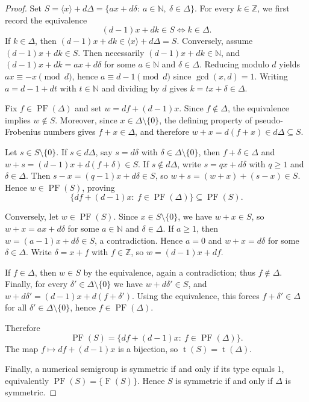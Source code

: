 \documentclass[10pt,a4paper]{amsart}
\begin{document}
\begin{proof}
Set $S=\langle x\rangle+d\Delta=\{ax+d\delta:\ a\in\mathbb{N},\ \delta\in\Delta\}$.
For every \(k\in\mathbb{Z}\), we first record the equivalence
\[
(d-1)x+dk\in S \iff k\in\Delta.
\]
If $k\in\Delta$, then $(d-1)x+dk\in\langle x\rangle+d\Delta=S$. Conversely, assume
\((d-1)x+dk\in S\). Then necessarily \((d-1)x+dk\in\mathbb{N}\), and $(d-1)x+dk=ax+d\delta$ for some $a\in\mathbb{N}$ and
$\delta\in\Delta$. Reducing modulo $d$ yields $ax\equiv -x\pmod d$, hence
$a\equiv d-1\pmod d$ since $\gcd(x,d)=1$. Writing $a=d-1+dt$ with
$t\in\mathbb{N}$ and dividing by $d$ gives $k=tx+\delta\in\Delta$.

Fix $f\in\operatorname{PF}(\Delta)$ and set $w=df+(d-1)x$. Since $f\notin\Delta$,
the equivalence implies $w\notin S$. Moreover, since $x\in\Delta\setminus\{0\}$,
the defining property of pseudo-Frobenius numbers gives $f+x\in\Delta$, and therefore
$w+x=d(f+x)\in d\Delta\subseteq S$.

Let $s\in S\setminus\{0\}$. If $s\in d\Delta$, say $s=d\delta$ with
$\delta\in\Delta\setminus\{0\}$, then $f+\delta\in\Delta$ and
$w+s=(d-1)x+d(f+\delta)\in S$. If $s\notin d\Delta$, write
$s=qx+d\delta$ with $q\ge 1$ and $\delta\in\Delta$. Then
$s-x=(q-1)x+d\delta\in S$, so $w+s=(w+x)+(s-x)\in S$. Hence
$w\in\operatorname{PF}(S)$, proving
\[
\{df+(d-1)x:\ f\in\operatorname{PF}(\Delta)\}\subseteq \operatorname{PF}(S).
\]

Conversely, let $w\in\operatorname{PF}(S)$. Since $x\in S\setminus\{0\}$, we have
$w+x\in S$, so $w+x=ax+d\delta$ for some $a\in\mathbb{N}$ and $\delta\in\Delta$.
If $a\ge 1$, then $w=(a-1)x+d\delta\in S$, a contradiction. Hence $a=0$ and
$w+x=d\delta$ for some $\delta\in\Delta$. Write $\delta=x+f$ with
$f\in\mathbb{Z}$, so $w=(d-1)x+df$.

If $f\in\Delta$, then $w\in S$ by the equivalence, again a contradiction; thus
$f\notin\Delta$. Finally, for every $\delta'\in\Delta\setminus\{0\}$ we have
$w+d\delta'\in S$, and
$w+d\delta'=(d-1)x+d(f+\delta')$. Using the equivalence, this forces
$f+\delta'\in\Delta$ for all $\delta'\in\Delta\setminus\{0\}$, hence
$f\in\operatorname{PF}(\Delta)$.

Therefore
\[
\operatorname{PF}(S)=\{df+(d-1)x:\ f\in \operatorname{PF}(\Delta)\}.
\]
The map $f\mapsto df+(d-1)x$ is a bijection, so $\operatorname{t}(S)=\operatorname{t}(\Delta)$.

Finally, a numerical semigroup is symmetric if and only if its type equals $1$,
equivalently $\operatorname{PF}(S)=\{\operatorname{F}(S)\}$. Hence $S$ is symmetric if and only if $\Delta$ is symmetric. 
\end{proof}
\end{document}
